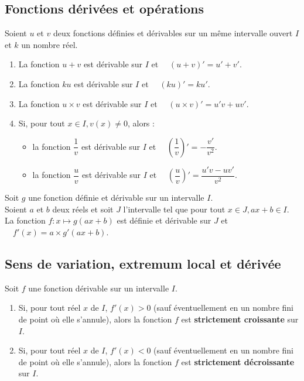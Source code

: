 \documentclass[a4paper,11pt,cours]{nsi} %
\begin{document}
\subsection*{Fonctions dérivées et opérations}
\begin{propriete}[]
    Soient $u$ et $v$ deux fonctions définies et dérivables sur un même intervalle ouvert $I$ et $k$ un nombre réel.
    \begin{enumerate}[label=\textbullet]
        \item La fonction $u+v$ est dérivable sur $I$ et $\quad (u+v)'=u'+v'$.
        \item La fonction $ku$ est dérivable sur $I$ et $\quad (ku)'=ku'$.
\newpage
        \item La fonction $u\times v$ est dérivable sur $I$ et $\quad (u\times v)'=u'v+ uv'$.
        \item Si, pour tout $x\in I, v(x)\neq 0$, alors :
        \begin{itemize}
            \item la fonction $\dfrac{1}{v}$ est dérivable sur $I$ et $\quad \left(\dfrac{1}{v}\right)'=-\dfrac{v'}{v^2}$.
            \item la fonction $\dfrac{u}{v}$ est dérivable sur $I$ et $\quad \left(\dfrac{u}{v}\right)'=\dfrac{u'v-uv'}{v^2}$.
        \end{itemize}
	\end{enumerate}
\end{propriete}

\begin{propriete}[]
	Soit $g$ une fonction définie et dérivable sur un intervalle $I$.\\
	Soient $a$ et $b$ deux réels et soit $J$ l'intervalle tel que pour tout $x\in J, ax+b \in I$.\\[.5em]
	La fonction $f:x\mapsto g(ax+b)$ est définie et dérivable sur $J$ et
		$\quad f'(x)=a\times g'(ax+b)$.
\end{propriete}

\subsection*{Sens de variation, extremum local et dérivée}

\begin{propriete}[]
	Soit $f$ une fonction dérivable sur un intervalle $I$.
	\begin{enumerate}[label=\textbullet]
		\item Si, pour tout réel $x$ de $I$, $f'(x)>0$ (sauf éventuellement en un nombre fini de point où elle s'annule), alors la fonction $f$ est \textbf{strictement croissante} sur $I$.
		\item Si, pour tout réel $x$ de $I$, $f'(x)<0$ (sauf éventuellement en un nombre fini de point où elle s'annule), alors la fonction $f$ est \textbf{strictement décroissante} sur $I$.
	\end{enumerate}
\end{propriete}
\end{document}
